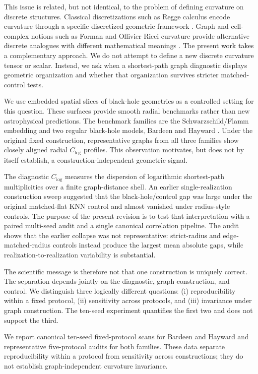 \documentclass[11pt]{article}
\newcommand{\clog}{C_{\log}}
\begin{document}
This issue is related, but not identical, to the problem of defining curvature
on discrete structures. Classical discretizations such as Regge calculus encode
curvature through a specific discretized geometric framework \cite{Regge1961}.
Graph and cell-complex notions such as Forman and Ollivier Ricci curvature
provide alternative discrete analogues with different mathematical meanings
\cite{Forman2003,Ollivier2009}. The present work takes a complementary
approach. We do not attempt to define a new discrete curvature tensor or scalar.
Instead, we ask when a shortest-path graph diagnostic displays geometric
organization and whether that organization survives stricter matched-control
tests.

We use embedded spatial slices of black-hole geometries as a controlled setting
for this question. These surfaces provide smooth radial benchmarks rather than
new astrophysical predictions. The benchmark families are the
Schwarzschild/Flamm embedding and two regular black-hole models, Bardeen and
Hayward \cite{Schwarzschild1916,Flamm1916,Bardeen1968,Hayward2006}. Under the
original fixed construction, representative graphs from all three families show
closely aligned radial $\clog$ profiles. This observation motivates, but does
not by itself establish, a construction-independent geometric signal.

The diagnostic $\clog$ measures the dispersion of logarithmic shortest-path
multiplicities over a finite graph-distance shell. An earlier
single-realization construction sweep suggested that the black-hole/control gap
was large under the original matched-flat KNN control and almost vanished under
radius-style controls. The purpose of the present revision is to test that
interpretation with a paired multi-seed audit and a single canonical correlation
pipeline. The audit shows that the earlier collapse was not representative:
strict-radius and edge-matched-radius controls instead produce the largest mean
absolute gaps, while realization-to-realization variability is substantial.

The scientific message is therefore not that one construction is uniquely
correct. The separation depends jointly on the diagnostic, graph construction,
and control. We distinguish three logically different questions:
(i) reproducibility within a fixed protocol, (ii) sensitivity across protocols,
and (iii) invariance under graph construction. The ten-seed experiment quantifies
the first two and does not support the third.

We report canonical ten-seed fixed-protocol scans for Bardeen and Hayward and
representative five-protocol audits for both families. These data separate
reproducibility within a protocol from sensitivity across constructions; they
do not establish graph-independent curvature invariance.
\end{document}
